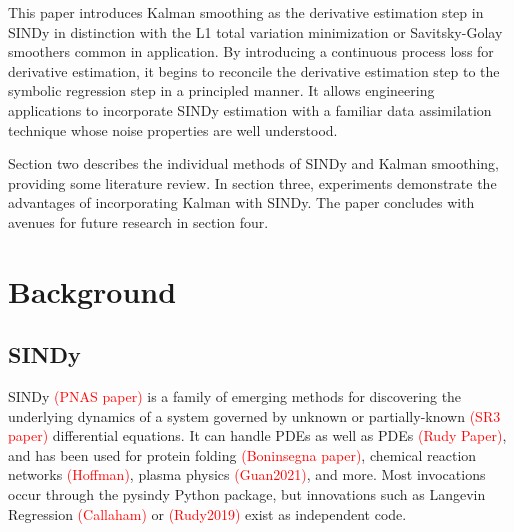 \documentclass{article}
\newcommand{\red}[1]{\textcolor{red}{#1}}
\begin{document}
This paper introduces Kalman smoothing as the derivative estimation step in SINDy in distinction with the L1 total variation minimization or Savitsky-Golay smoothers common in application.
By introducing a continuous process loss for derivative estimation, it begins to reconcile the derivative estimation step to the symbolic regression step in a principled manner.
It allows engineering applications to incorporate SINDy estimation with a familiar data assimilation technique whose noise properties are well understood.

Section two describes the individual methods of SINDy and Kalman smoothing, providing some literature review.  In section three, experiments demonstrate the advantages of incorporating Kalman with SINDy.  The paper concludes with avenues for future research in section four.

\section{Background}

\subsection{SINDy}
SINDy \red{(PNAS paper)} is a family of emerging methods for discovering the underlying dynamics of a system governed by unknown or partially-known \red{(SR3 paper)} differential equations.  It can handle PDEs as well as PDEs \red{(Rudy Paper)}, and has been used for protein folding \red{(Boninsegna paper)}, chemical reaction networks \red{(Hoffman)}, plasma physics \red{(Guan2021)}, and more.  Most invocations occur through the pysindy Python package, but innovations such as Langevin Regression \red{(Callaham)} or \red{(Rudy2019)} exist as independent code.
\end{document}
